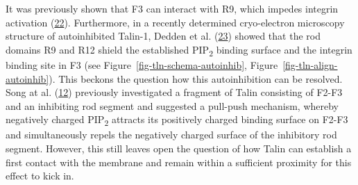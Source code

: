 \documentclass[
  twocolumn]{biophys-new-mod}
\begin{document}
It was previously shown that F3 can interact with R9, which impedes
integrin activation
(\protect\hyperlink{ref-bannoSubcellularLocalizationTalin2012}{22}).
Furthermore, in a recently determined cryo-electron microscopy structure
of autoinhibited Talin-1, Dedden et al.
(\protect\hyperlink{ref-deddenArchitectureTalin1Reveals2019a}{23})
showed that the rod domains R9 and R12 shield the established
PIP\textsubscript{2} binding surface and the integrin binding site in F3
(see
Figure~\ref{fig-tln-schema-autoinhib}, Figure~\ref{fig-tln-align-autoinhib}).
This beckons the question how this autoinhibition can be resolved. Song
at al.
(\protect\hyperlink{ref-songNovelMembranedependentSwitch2012a}{12})
previously investigated a fragment of Talin consisting of F2-F3 and an
inhibiting rod segment and suggested a pull-push mechanism, whereby
negatively charged PIP\textsubscript{2} attracts its positively charged
binding surface on F2-F3 and simultaneously repels the negatively
charged surface of the inhibitory rod segment. However, this still
leaves open the question of how Talin can establish a first contact with
the membrane and remain within a sufficient proximity for this effect to
kick in.
\end{document}
